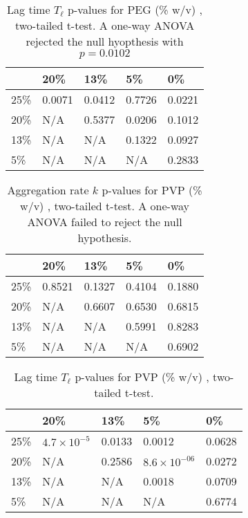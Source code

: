 \begin{table}[b!]
  \caption[Lag time p-values for PEG.]{Lag time $T_\ell$ p-values for PEG (\% w/v) , two-tailed t-test. A one-way ANOVA rejected the null hyopthesis with $p=0.0102$}
    \label{table:p-tl-values-peg}
    \begin{tabular}{p{2cm}|p{3cm}p{3cm}p{3cm}p{3cm}}
        &20\% &  13\% & 5\% & 0\% \\ \hline
	25\% & 0.0071 & 0.0412 & 0.7726 &0.0221\\
	20\% & N/A &0.5377 &  0.0206 & 0.1012\\
     	13\% & N/A  & N/A & 0.1322 & 0.0927\\
      	5\% & N/A & N/A  & N/A &0.2833\\
    \end{tabular}
\end{table}

\begin{table}[b!]
  \caption[Aggregation rate p-values for PVP.]{Aggregation rate $k$ p-values for PVP (\% w/v) , two-tailed t-test. A one-way ANOVA failed to reject the null hypothesis.}
    \label{table:p-k-values-pvp}
    \begin{tabular}{p{2cm}|p{3cm}p{3cm}p{3cm}p{3cm}}
        &20\% &  13\% & 5\% & 0\% \\ \hline
	25\% & 0.8521 & 0.1327 & 0.4104 &0.1880\\
	20\% & N/A &0.6607 & 0.6530 & 0.6815\\
     	13\% & N/A  & N/A & 0.5991 & 0.8283\\
      	5\% & N/A & N/A  & N/A & 0.6902\\
    \end{tabular}
\end{table}

\begin{table}[b!]
  \caption[Lag time p-values for PVP.]{Lag time $T_\ell$ p-values for PVP (\% w/v) , two-tailed t-test.}
    \label{table:p-tl-values-pvp}
    \begin{tabular}{p{2cm}|p{3cm}p{3cm}p{3cm}p{3cm}}
        &20\% &  13\% & 5\% & 0\% \\ \hline
	25\% & $4.7\times 10^{-5}$ & 0.0133 & 0.0012 &0.0628\\
	20\% & N/A &0.2586 &  $8.6\times 10^{-06}$ & 0.0272\\
     	13\% & N/A  & N/A & 0.0018 & 0.0709\\
      	5\% & N/A & N/A  & N/A &0.6774\\
    \end{tabular}
\end{table}